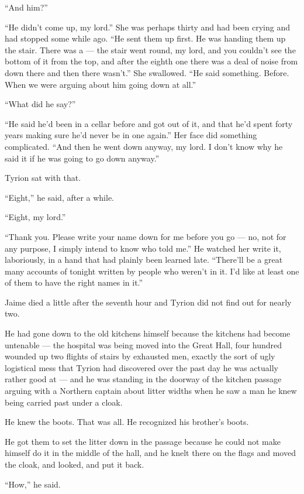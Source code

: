 “And him?”

“He didn’t come up, my lord.” She was perhaps thirty and had been crying and had stopped some while ago. “He sent them up first. He was handing them up the stair. There was a — the stair went round, my lord, and you couldn’t see the bottom of it from the top, and after the eighth one there was a deal of noise from down there and then there wasn’t.” She swallowed. “He said something. Before. When we were arguing about him going down at all.”

“What did he say?”

“He said he’d been in a cellar before and got out of it, and that he’d spent forty years making sure he’d never be in one again.” Her face did something complicated. “And then he went down anyway, my lord. I don’t know why he said it if he was going to go down anyway.”

Tyrion sat with that.

“Eight,” he said, after a while.

“Eight, my lord.”

“Thank you. Please write your name down for me before you go — no, not for any purpose, I simply intend to know who told me.” He watched her write it, laboriously, in a hand that had plainly been learned late. “There’ll be a great many accounts of tonight written by people who weren’t in it. I’d like at least one of them to have the right names in it.”

\sceneBreak

Jaime died a little after the seventh hour and Tyrion did not find out for nearly two.

He had gone down to the old kitchens himself because the kitchens had become untenable — the hospital was being moved into the Great Hall, four hundred wounded up two flights of stairs by exhausted men, exactly the sort of ugly logistical mess that Tyrion had discovered over the past day he was actually rather good at — and he was standing in the doorway of the kitchen passage arguing with a Northern captain about litter widths when he saw a man he knew being carried past under a cloak.

He knew the boots. That was all. He recognized his brother’s boots.

He got them to set the litter down in the passage because he could not make himself do it in the middle of the hall, and he knelt there on the flags and moved the cloak, and looked, and put it back.

“How,” he said.


